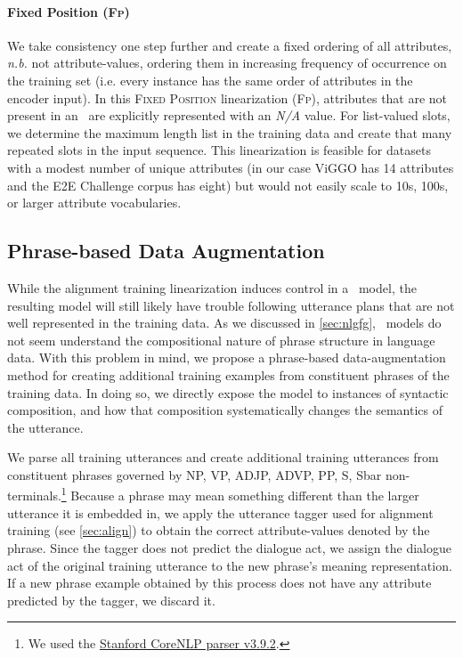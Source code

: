 \paragraph{Fixed Position (\textsc{Fp})} We take  consistency one step further
and create a fixed ordering of all attributes, \textit{n.b.} not
attribute-values, ordering them in increasing frequency of occurrence on the
training set (i.e. every instance has the same order of attributes in the
encoder input). In this \textsc{Fixed Position} linearization (\textsc{Fp}),
attributes that are not present in an \meaningrepresentation~are explicitly
represented with an \textit{N/A} value.  For list-valued slots, we determine
the maximum length list in the training data and create that many repeated
slots in the input sequence.  This linearization is feasible for datasets with
a modest number of unique attributes (in our case ViGGO has 14 attributes and
the E2E Challenge corpus has eight) but would not easily scale to 10s, 100s, or
larger attribute vocabularies. 

\subsection{Phrase-based Data Augmentation}
\label{sec:pbda}



While the alignment training linearization induces control in a
\sequencetosequence~model, the resulting model will still likely have trouble
following utterance plans that are not well represented in the training data.
As we discussed in \autoref{sec:nlgfg}, \sequencetosequence~models do not seem
understand the compositional nature of phrase structure in language data. With
this problem in mind, we propose a phrase-based data-augmentation method for
creating additional training examples from constituent phrases of the training
data. In doing so, we directly expose the model to instances of syntactic
composition, and how that composition systematically changes the semantics of
the utterance.

We parse all training utterances and create additional training utterances from
constituent phrases governed by NP, VP, ADJP, ADVP, PP, S, Sbar
non-terminals.\footnote{We used the
\href{https://stanfordnlp.github.io/CoreNLP/}{Stanford CoreNLP parser v3.9.2}.}
Because a phrase may mean something different than the larger utterance it is
embedded in, we apply the utterance tagger used for alignment training (see
\autoref{sec:align}) to obtain the correct attribute-values denoted by the
phrase. Since the tagger does not predict the dialogue act, we assign the
dialogue act of the original training utterance to the new phrase's meaning
representation.  If a new phrase example obtained by this process does not have
any attribute predicted by the tagger, we discard it.

